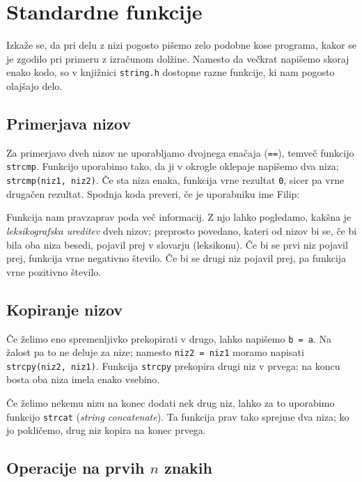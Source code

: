 \documentclass{book}
\begin{document}
\section{Standardne funkcije}

Izkaže se, da pri delu z nizi pogosto pišemo zelo podobne kose programa, kakor
se je zgodilo pri primeru z izračunom dolžine.
Namesto da večkrat napišemo skoraj enako kodo, so v knjižnici \verb+string.h+
dostopne razne funkcije, ki nam pogosto olajšajo delo.

\subsection{Primerjava nizov}

Za primerjavo dveh nizov ne uporabljamo dvojnega enačaja
(\verb+==+), temveč funkcijo \verb+strcmp+.
Funkcijo uporabimo tako, da ji v okrogle oklepaje napišemo dva niza;
\verb+strcmp(niz1, niz2)+.
Če sta niza enaka, funkcija vrne rezultat \verb+0+, sicer pa vrne drugačen
rezultat.
Spodnja koda preveri, če je uporabniku ime Filip:

Funkcija nam pravzaprav poda več informacij.
Z njo lahko pogledamo, kakšna je \textit{leksikografska ureditev} dveh nizov;
preprosto povedano, kateri od nizov bi se, če bi bila oba niza besedi, pojavil
prej v slovarju (leksikonu).
Če bi se prvi niz pojavil prej, funkcija vrne negativno število.
Če bi se drugi niz pojavil prej, pa funkcija vrne pozitivno število.

\subsection{Kopiranje nizov}

Če želimo eno spremenljivko prekopirati v drugo, lahko napišemo \verb+b = a+.
Na žalost pa to ne deluje za nize; namesto \verb+niz2 = niz1+ moramo napisati
\verb+strcpy(niz2, niz1)+.
Funkcija \verb+strcpy+ prekopira drugi niz v prvega; na koncu bosta oba niza
imela enako vsebino.

Če želimo nekemu nizu na konec dodati nek drug niz, lahko za to uporabimo
funkcijo \verb+strcat+ (\textit{string concatenate}).
Ta funkcija prav tako sprejme dva niza; ko jo pokličemo, drug niz kopira na
konec prvega.

\subsection{Operacije na prvih $n$ znakih}
\end{document}
